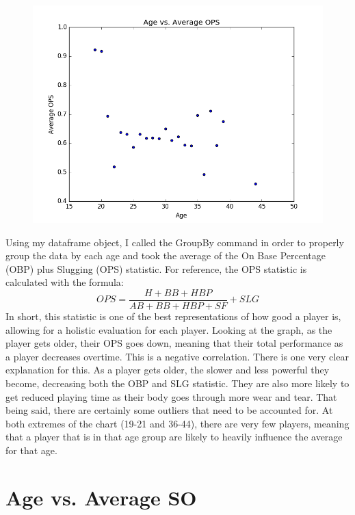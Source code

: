 \documentclass{acmart}
\begin{document}
\begin{figure}[H]
\includegraphics[scale=.5]{AgevsAverageOPS.png}
\end{figure}

Using my dataframe object, I called the GroupBy command in order to properly group the data by each age and took the average of the On Base Percentage (OBP) plus Slugging (OPS) statistic. For reference, the OPS statistic is calculated with the formula:
$$
OPS = \frac{H + BB + HBP}{AB + BB + HBP + SF} + SLG
$$
In short, this statistic is one of the best representations of how good a player is, allowing for a holistic evaluation for each player. Looking at the graph, as the  player gets older, their OPS goes down, meaning that their total performance as a player decreases overtime. This is a negative correlation. There is one very clear explanation for this. As a player gets older, the slower and less powerful they become, decreasing both the OBP and SLG statistic. They are also more likely to get reduced playing time as their body goes through more wear and tear. That being said, there are certainly some outliers that need to be accounted for. At both extremes of the chart (19-21 and 36-44), there are very few players, meaning that a player that is in that age group are likely to heavily influence the average for that age.

\section*{Age vs. Average SO}
\end{document}
